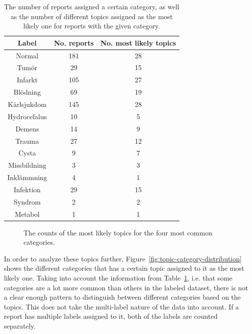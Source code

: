 \begin{table}
    \centering
    \begin{tabular}{|c|cc|}
        \hline
        \textbf{Label} & \textbf{No. reports} & \textbf{No. most likely topics} \\
        \hline
        Normal & 181 & 28\\
        Tumör & 29 & 15\\
        Infarkt & 105 & 27\\
        Blödning & 69 & 19\\
        Kärlsjukdom & 145 & 28\\
        Hydrocefalus & 10 & 5\\
        Demens & 14 & 9\\
        Trauma & 27 & 12\\
        Cysta & 9 & 7\\
        Missbildning & 3 & 3\\
        Inklämmning & 4 & 1\\
        Infektion & 29 & 15\\
        Syndrom & 2 & 2\\
        Metabol & 1 & 1\\
        \hline
    \end{tabular}
    \caption{The number of reports assigned a certain category, as well as the number of different topics assigned as the most likely one for reports with the given category.}
    \label{tab:topic-categories}
\end{table}

\begin{figure}[h!]
    \centering
    \quad
    \caption{The counts of the most likely topics for the four most common categories.}
    \label{fig:category-label-distribution}
\end{figure}

In order to analyze these topics further, Figure~\ref{fig:topic-category-distribution} shows the different categories that has a certain topic assigned to it as the most likely one.
Taking into account the information from Table~\ref{tab:topic-categories}, i.e. that some categories are a lot more common than others in the labeled dataset, there is not a clear enough pattern to distinguish between different categories based on the topics.
This does not take the multi-label nature of the data into account.
If a report has multiple labels assigned to it, both of the labels are counted separately.

